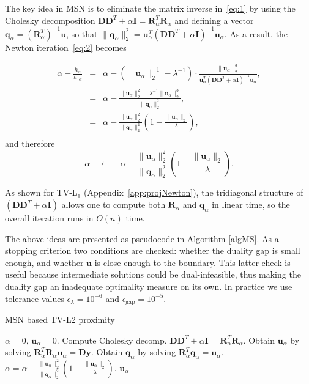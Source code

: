 \documentclass[twoside,11pt]{article}
\newcommand{\vq}{\bm{q}}       \newcommand{\vqh}{\hat{\bm{q}}}        \newcommand{\qh}{\hat{q}}    \newcommand{\vqt}{\tilde{\bm{q}}}       \newcommand{\qt}{\tilde{q}}
\newcommand{\vu}{\bm{u}}       \newcommand{\vuh}{\hat{\bm{u}}}        \newcommand{\uh}{\hat{u}}    \newcommand{\vut}{\tilde{\bm{u}}}       \newcommand{\ut}{\tilde{u}}
\newcommand{\vy}{\bm{y}}       \newcommand{\vyh}{\hat{\bm{y}}}        \newcommand{\yh}{\hat{y}}    \newcommand{\vyt}{\tilde{\bm{y}}}       \newcommand{\yt}{\tilde{y}}
\newcommand{\md}{\bm{D}}
\newcommand{\mi}{\bm{I}}
\newcommand{\mr}{\bm{R}}
\newcommand{\mynorm}[2]{\| {#1} \|_{#2}}
\newcommand{\enorm}[1]{\mynorm{#1}{2}}
\numberwithin{equation}{section}
\numberwithin{theorem}{section}
\begin{document}
The key idea in MSN is to eliminate the matrix inverse in~\eqref{eq:1} by using the Cholesky decomposition $\md \md^T + \alpha \mi = \mr^T_{\alpha} \mr_{\alpha}$ and defining a vector $\vq_{\alpha} = (\mr^T_{\alpha})^{-1} \vu$, so that $\enorm{\vq_{\alpha}}^2 = \vu_{\alpha}^T(\md \md^T+\alpha \mi)^{-1} \vu_{\alpha}$. As a result, the Newton iteration~\eqref{eq:2} becomes

\begin{eqnarray*}
        \alpha - \frac{h_{\alpha}}{h'_{\alpha}} & = & \alpha - (\enorm{\vu_{\alpha}}^{-1} - \lambda^{-1}) \cdot \frac{\enorm{\vu_{\alpha}}^3}{\vu_{\alpha}^T(\md \md^T+\alpha \mi)^{-1} \vu_{\alpha}}, \\
         & = & \alpha - \frac{\enorm{\vu_{\alpha}}^2 - \lambda^{-1} \enorm{\vu_{\alpha}}^3}{\enorm{\vq_{\alpha}}^2},  \\
         & = & \alpha - \frac{\enorm{\vu_{\alpha}}^2}{\enorm{\vq_{\alpha}}^2} \left( 1 - \frac{\enorm{\vu_{\alpha}}}{\lambda} \right), \\
\end{eqnarray*}
and therefore
\begin{equation}
  \label{eq:MSNupdate}
  \alpha \quad \gets \quad \alpha - \frac{\enorm{\vu_{\alpha}}^2}{\enorm{\vq_{\alpha}}^2} \left( 1 - \frac{\enorm{\vu_{\alpha}}}{\lambda} \right).
\end{equation}

As shown for TV-L$_1$ (Appendix~\ref{app:projNewton}), the tridiagonal structure of $(\md \md^T + \alpha \mi)$ allows one to compute both $\mr_{\alpha}$ and $\vq_{\alpha}$ in linear time, so the overall iteration runs in $O(n)$ time.

The above ideas are presented as pseudocode in Algorithm \ref{algMS}. As a stopping criterion two conditions are checked: whether the duality gap is small enough, and whether $\vu$ is close enough to the boundary. This latter check is useful because intermediate solutions could be dual-infeasible, thus making the duality gap an inadequate optimality measure on its own. In practice we use tolerance values $\epsilon_{\lambda} = 10^{-6}$ and $\epsilon_{\text{gap}} = 10^{-5}$.

\begin{algorithm}[t]
 \caption{MSN based TV-L2 proximity}
 \label{algMS}
 \begin{algorithmic}
   $\alpha = 0$, $\vu_{\alpha} = 0$.
  \While{$\left| \enorm{\vu_{\alpha}}^2 - \lambda \right|$ $>$ $\epsilon_{\lambda}$ \textbf{or} $\text{gap}(\vu_{\alpha})$ $>$ $\epsilon_{\text{gap}}$}
   \State Compute Cholesky decomp. $\md \md^T + \alpha \mi = \mr^T_{\alpha} \mr_{\alpha}$.
   \State Obtain $\vu_{\alpha}$ by solving $\mr^T_{\alpha} \mr_{\alpha} \vu_{\alpha} = \md \vy$.
   \State Obtain $\vq_{\alpha}$ by solving $\mr^T_{\alpha} \vq_{\alpha} = \vu_{\alpha}$.
   \State $\alpha = \alpha - \frac{\enorm{\vu_{\alpha}}^2}{\enorm{\vq_{\alpha}}^2} \left( 1 - \frac{\enorm{\vu_{\alpha}}}{\lambda} \right)$.
  \EndWhile
  \State\Return $\vu_{\alpha}$
 \end{algorithmic}
\end{algorithm}
\end{document}
